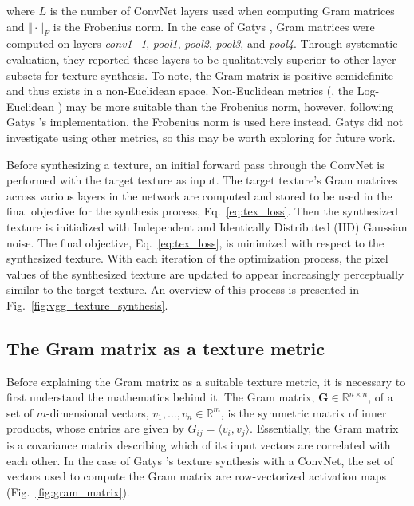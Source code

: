 where $L$ is the number of ConvNet layers used when computing Gram matrices
and $\Vert \cdot \Vert_F$ is the Frobenius norm. In the case of Gatys \etal \cite{gatys2015}, Gram matrices were computed on
layers \emph{conv1\_1}, \emph{pool1}, \emph{pool2}, \emph{pool3}, and \emph{pool4}. Through systematic evaluation, they reported these layers to be qualitatively superior to other layer subsets for texture synthesis.
To note, the Gram matrix is positive semidefinite and thus exists in a non-Euclidean space. Non-Euclidean metrics (\eg, the Log-Euclidean \cite{arsigny2006}) may be more suitable than the Frobenius norm, however, following Gatys \etal's \cite{gatys2015} implementation, the Frobenius norm is used here instead. Gatys \etal did not investigate using other metrics, so this may be worth exploring for future work.

Before synthesizing a texture, an initial forward pass through the ConvNet is
performed with the target texture as input. The target texture's Gram matrices
across various layers in the network are computed and stored to be used in the final objective for
the synthesis process, Eq.\ \ref{eq:tex_loss}. Then the synthesized texture is initialized with Independent and Identically Distributed (IID)
Gaussian noise. The final
objective, Eq.\ \ref{eq:tex_loss}, is minimized with respect to the synthesized texture. With each
iteration of the optimization process, the pixel values of the synthesized texture are updated to appear increasingly
perceptually similar to the target texture. An overview of this process is presented in Fig.\ \ref{fig:vgg_texture_synthesis}.
\clearpage

\clearpage

\subsection{The Gram matrix as a texture metric}

Before explaining the Gram matrix as a suitable texture metric, it is necessary to first understand the mathematics behind it. The Gram matrix, $\mathbf{G} \in \mathbb{R}^{n \times n}$, of a set of $m$-dimensional vectors, $v_1, \dots , v_n \in \mathbb{R}^m$, is the symmetric matrix of inner products, whose entries are given by $G_{ij} = \langle v_i, v_j \rangle$. Essentially, the Gram matrix is a covariance matrix describing which of its input vectors are correlated with each other. In the case of Gatys \etal's \cite{gatys2015} texture synthesis with a ConvNet, the set of vectors used to compute the Gram matrix are row-vectorized activation maps (Fig.\ \ref{fig:gram_matrix}).


